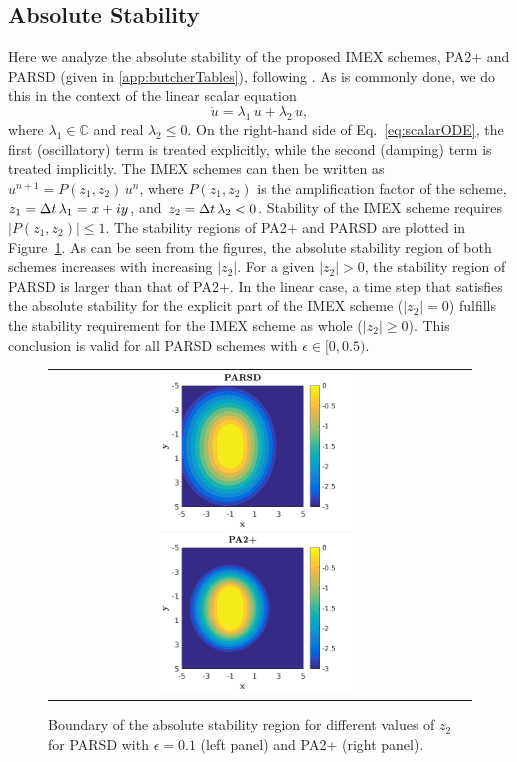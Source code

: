 \subsection{Absolute Stability}

Here we analyze the absolute stability of the proposed IMEX schemes, PA2+ and PARSD (given in \ref{app:butcherTables}), following \cite{hu_etal_2018}.  
As is commonly done, we do this in the context of the linear scalar equation
\begin{equation}
  \dot{u}=\lambda_{1}\,u+\lambda_{2}\,u,
  \label{eq:scalarODE}
\end{equation}
where $\lambda_{1}\in\mathbb{C}$ and real $\lambda_{2}\le0$.  
On the right-hand side of Eq.~\eqref{eq:scalarODE}, the first (oscillatory) term is treated explicitly, while the second (damping) term is treated implicitly.  
The IMEX schemes can then be written as $u^{n+1} =P(z_{1},z_{2})\,u^{n}$, where $P(z_{1},z_{2})$ is the amplification factor of the scheme, $z_{1}=\Delta t\,\lambda_{1} = x +iy$, and $z_{2} = \Delta t\,\lambda_{2} < 0$.  
Stability of the IMEX scheme requires $|P(z_1,z_2)|\leq 1$.  
The stability regions of PA2+ and PARSD are plotted in Figure~\ref{fig:AbsoluteStability}.  
As can be seen from the figures, the absolute stability region of both schemes increases with increasing $|z_{2}|$.  
For a given $|z_{2}|>0$, the stability region of PARSD is larger than that of PA2+.  
In the linear case, a time step that satisfies the absolute stability for the explicit part of the IMEX scheme ($|z_2| = 0$) fulfills the stability requirement for the IMEX scheme as whole ($|z_2| \geq 0$).  
This conclusion is valid for all PARSD schemes with $\epsilon\in [0,0.5)$.
\begin{figure}[h]
  \centering
  \begin{tabular}{cc}
    \includegraphics[width=0.5\textwidth]{figures/AbsoluteStabilityPARSD}
    \includegraphics[width=0.5\textwidth]{figures/AbsoluteStabilityPA2+}
  \end{tabular}
   \caption{Boundary of the absolute stability region for different values of $z_2$ for PARSD with $\epsilon = 0.1$ (left panel) and PA2+ (right panel).}
  \label{fig:AbsoluteStability}
\end{figure}